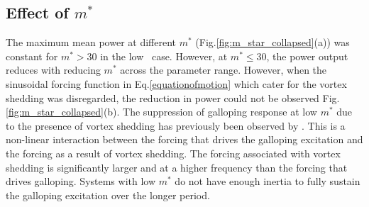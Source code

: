  
  



\subsection{Effect of $m^*$}

 
 

The maximum mean power at different $m^*$ (Fig.\ref{fig:m_star_collapsed}(a)) was constant for $m^*>30$ in the low \reynoldsnumber\ case. However, at $m^* \leq 30$, the power output reduces with reducing $m^*$ across the parameter range. However, when the sinusoidal forcing function in Eq.\ref{equationofmotion} which cater for the vortex shedding was disregarded, the reduction in power could not be observed Fig.\ref{fig:m_star_collapsed}(b). The suppression of galloping response at low $m^*$ due to the presence of vortex shedding has previously been observed by \cite{Joly2012}. This is a non-linear interaction between the forcing that drives the galloping excitation and the forcing as a result of vortex shedding. The forcing associated with vortex  shedding is significantly larger and at a higher frequency than the forcing that drives galloping. Systems with low $m^*$ do not have enough inertia to fully sustain the galloping excitation over the longer period.

